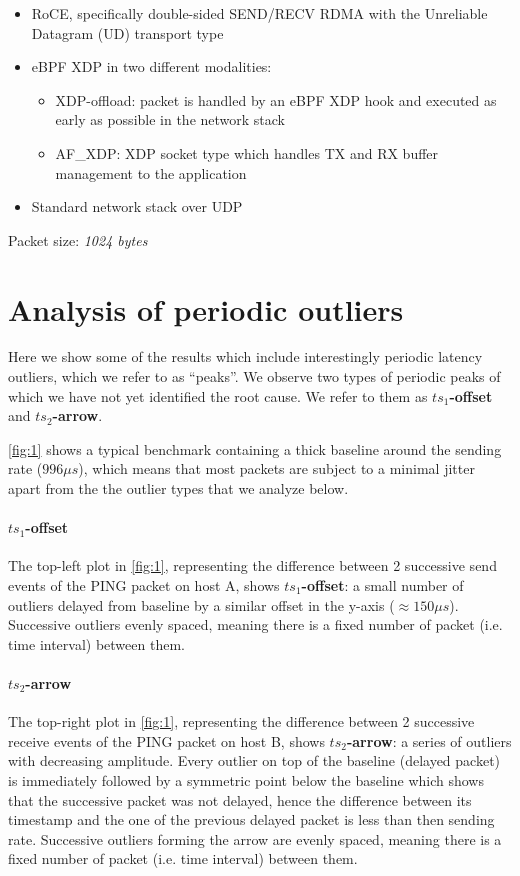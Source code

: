 \documentclass{article}
\begin{document}
\begin{itemize}
  \vspace{-0.8mm}
  \itemsep=-0.4mm
  \item RoCE, specifically double-sided SEND/RECV RDMA with the Unreliable Datagram (UD) 
  transport type
  \item eBPF XDP in two different modalities:
  \vspace{-1.8mm}
  \begin{itemize}
    \itemsep=-0.5mm
    \item XDP-offload: packet is handled by an eBPF XDP hook and executed as early
    as possible in the network stack 
    \item AF\_XDP: XDP socket type which handles TX and RX buffer management to 
    the application
  \end{itemize}
    \item Standard network stack over UDP    
\end{itemize}

\noindent
Packet size: \textit{1024 bytes}


\section{Analysis of periodic outliers}
Here we show some of the results which include interestingly periodic latency 
outliers, which we refer to as ``peaks''. We observe two types of periodic peaks 
of which we have not yet identified the root
cause. We refer to them as \textbf{$ts_1$-offset} and \textbf{$ts_2$-arrow}.

\autoref{fig:1} shows a typical benchmark containing a thick baseline around the 
sending rate ($996\mu s$), which means that most packets are subject to a minimal 
jitter apart from the the outlier types that we analyze below.

\paragraph*{$ts_1$-offset} The top-left plot in \autoref{fig:1}, representing the difference
between 2 successive send events of the PING packet on host A, shows 
\textbf{$ts_1$-offset}:
a small number of outliers delayed from baseline by a similar offset in the 
y-axis ($\approx150\mu s$). Successive outliers evenly spaced, meaning there is a 
fixed number of packet (i.e. time interval) between them. 

\paragraph*{$ts_2$-arrow} The top-right plot in \autoref{fig:1}, representing 
the difference 
between 2 successive receive events of the PING packet on host B, shows 
\textbf{$ts_2$-arrow}: a 
series of outliers with decreasing amplitude. Every outlier on top of the 
baseline (delayed packet) is immediately followed by a symmetric point below the
baseline which shows that the successive packet was not delayed, hence the 
difference between its timestamp and the one of the previous delayed packet is
less than then sending rate. 
Successive outliers forming the arrow are evenly spaced, meaning there is a 
fixed number of packet (i.e. time interval) between them. 
\end{document}
